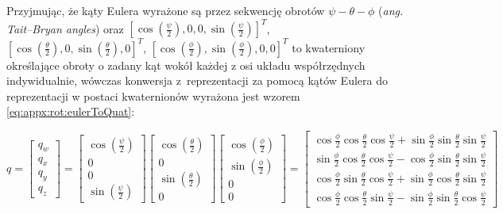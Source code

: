 Przyjmując, że kąty Eulera wyrażone są przez sekwencję obrotów $\psi-\theta-\phi$ (\emph{ang. Tait–Bryan angles}) oraz $[\cos(\frac{\psi}{2}), 0, 0, \sin(\frac{\psi}{2})]^T$, $[\cos(\frac{\theta}{2}), 0, \sin(\frac{\theta}{2}), 0]^T$, $[\cos(\frac{\phi}{2}), \sin(\frac{\phi}{2}), 0, 0]^T$ to kwaterniony określające obroty o zadany kąt wokół każdej z osi układu współrzędnych indywidualnie, wówczas konwersja z~reprezentacji za pomocą kątów Eulera do reprezentacji w postaci kwaternionów wyrażona jest wzorem \ref{eq:appx:rot:eulerToQuat}:
																													
\begin{equation}
	\label{eq:appx:rot:eulerToQuat}
	q = 
	\begin{bmatrix}
		q_w \\
		q_x \\
		q_y \\
		q_z 
	\end{bmatrix} 
	= 	\begin{bmatrix}\cos(\frac{\psi}{2})\\ 0\\ 0\\ \sin(\frac{\psi}{2})\end{bmatrix}\begin{bmatrix}\cos(\frac{\theta}{2})\\ 0\\ \sin(\frac{\theta}{2})\\ 0\end{bmatrix}\begin{bmatrix}\cos(\frac{\phi}{2})\\ \sin(\frac{\phi}{2})\\ 0\\ 0\end{bmatrix} = 
	\begin{bmatrix}
		\cos{\frac{\phi}{2}}\cos{\frac{\theta}{2}}\cos{\frac{\psi}{2}}+\sin{\frac{\phi}{2}}\sin{\frac{\theta}{2}}\sin{\frac{\psi}{2}} \\
		\sin{\frac{\phi}{2}}\cos{\frac{\theta}{2}}\cos{\frac{\psi}{2}}-\cos{\frac{\phi}{2}}\sin{\frac{\theta}{2}}\sin{\frac{\psi}{2}} \\
		\cos{\frac{\phi}{2}}\sin{\frac{\theta}{2}}\cos{\frac{\psi}{2}}+\sin{\frac{\phi}{2}}\cos{\frac{\theta}{2}}\sin{\frac{\psi}{2}} \\
		\cos{\frac{\phi}{2}}\cos{\frac{\theta}{2}}\sin{\frac{\psi}{2}}-\sin{\frac{\phi}{2}}\sin{\frac{\theta}{2}}\cos{\frac{\psi}{2}} 
	\end{bmatrix}
\end{equation}


